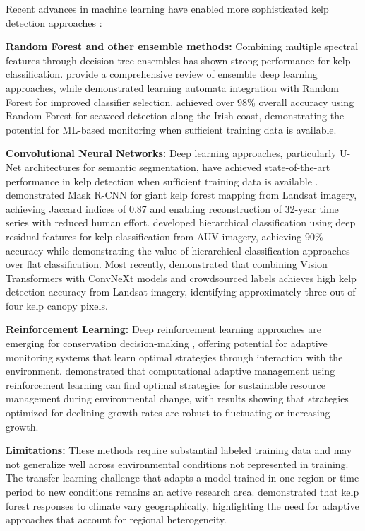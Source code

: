 \documentclass[12pt,oneside]{book}
\begin{document}
Recent advances in machine learning have enabled more sophisticated kelp detection approaches \citep{Ma2019}:

\textbf{Random Forest and other ensemble methods:} Combining multiple spectral features through decision tree ensembles has shown strong performance for kelp classification. \citet{Ganaie2022} provide a comprehensive review of ensemble deep learning approaches, while \citet{Savargiv2021} demonstrated learning automata integration with Random Forest for improved classifier selection. \citet{TonionPirotti2022} achieved over 98\% overall accuracy using Random Forest for seaweed detection along the Irish coast, demonstrating the potential for ML-based monitoring when sufficient training data is available.

\textbf{Convolutional Neural Networks:} Deep learning approaches, particularly U-Net architectures for semantic segmentation, have achieved state-of-the-art performance in kelp detection when sufficient training data is available \citep{Ma2019, Bai2023}. \citet{Marquez2022} demonstrated Mask R-CNN for giant kelp forest mapping from Landsat imagery, achieving Jaccard indices of 0.87 and enabling reconstruction of 32-year time series with reduced human effort. \citet{Mahmood2020} developed hierarchical classification using deep residual features for kelp classification from AUV imagery, achieving 90\% accuracy while demonstrating the value of hierarchical classification approaches over flat classification. Most recently, \citet{Nasios2025} demonstrated that combining Vision Transformers with ConvNeXt models and crowdsourced labels achieves high kelp detection accuracy from Landsat imagery, identifying approximately three out of four kelp canopy pixels.

\textbf{Reinforcement Learning:} Deep reinforcement learning approaches are emerging for conservation decision-making \citep{Lapeyrolerie2022}, offering potential for adaptive monitoring systems that learn optimal strategies through interaction with the environment. \citet{Lindkvist2017} demonstrated that computational adaptive management using reinforcement learning can find optimal strategies for sustainable resource management during environmental change, with results showing that strategies optimized for declining growth rates are robust to fluctuating or increasing growth.

\textbf{Limitations:} These methods require substantial labeled training data and may not generalize well across environmental conditions not represented in training. The transfer learning challenge that adapts a model trained in one region or time period to new conditions remains an active research area. \citet{BeasLuna2020} demonstrated that kelp forest responses to climate vary geographically, highlighting the need for adaptive approaches that account for regional heterogeneity.
\end{document}
